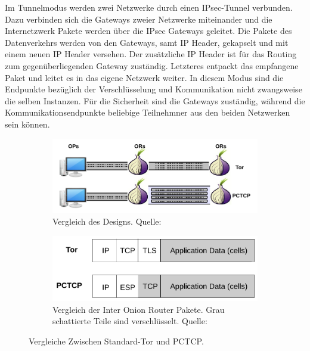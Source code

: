 \documentclass[fleqn,envcountsame,runningheads,10pt,a4paper]{llncs}
\begin{document}
Im Tunnelmodus werden zwei Netzwerke durch einen IPsec-Tunnel verbunden. Dazu 
verbinden sich die Gateways zweier Netzwerke miteinander und die Internetzwerk 
Pakete werden über die IPsec Gateways geleitet. Die Pakete des Datenverkehrs 
werden von den Gateways, samt IP Header, gekapselt und mit einem neuen IP 
Header versehen. Der zusätzliche IP Header ist für das Routing zum 
gegenüberliegenden Gateway zuständig. Letzteres entpackt das empfangene Paket 
und leitet es in das eigene Netzwerk weiter. In diesem Modus sind die Endpunkte 
bezüglich der Verschlüsselung und Kommunikation nicht zwangsweise die selben 
Instanzen. Für die Sicherheit sind die Gateways zuständig, während die 
Kommunikationsendpunkte beliebige Teilnehmner aus den beiden Netzwerken sein 
können.

\begin{figure}[ht]
  \begin{center}
    \begin{subfigure}[t]{0.46\textwidth}
      \includegraphics[width=\textwidth]{pics/PCTCP_design.pdf}
      \caption{Vergleich des Designs. Quelle: \cite{pctcp}}
      \label{fig:pctcpdesign}
    \end{subfigure}
    \begin{subfigure}[t]{0.46\textwidth}
      \includegraphics[width=\textwidth]{pics/PCTCP_header.pdf}
      \caption{Vergleich der Inter Onion Router Pakete. Grau schattierte Teile sind verschlüsselt. Quelle:\cite{pctcp}}
      \label{fig:pctcpheader}
    \end{subfigure}
    \caption{Vergleiche Zwischen Standard-Tor und PCTCP.}
  \end{center} 
\end{figure}
\end{document}
